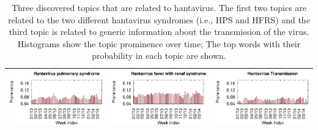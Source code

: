 \documentclass[conference]{IEEEtran}
\begin{document}
\begin{table}[t]
\begin{center}
\caption{Three discovered topics that are related to hantavirus. The first two topics are related to the two different hantavirus syndromes (i.e., HPS and HFRS) and the third topic is related to generic information about the  transmission of the virus. Histograms show the topic prominence over time; The top words with their probability in each topic are shown.}
\begin{tabular}{|lr|lr|lr|}
\hline
\multicolumn{2}{|c|}{\includegraphics[clip,scale=0.45]{fig/topic_hanta_timeline.eps}} & \multicolumn{2}{|c|}{\includegraphics[clip,scale=0.45]{fig/topic_hanta3_timeline.eps}}& 
\multicolumn{2}{|c|}{\includegraphics[clip,scale=0.45]{fig/topic_hanta2_timeline.eps}} \\ \hline

\end{tabular}
\end{center}
\end{table}
\end{document}
